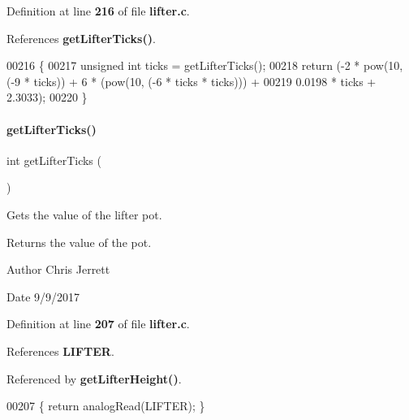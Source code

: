 Definition at line \textbf{ 216} of file \textbf{ lifter.\+c}.



References \textbf{ get\+Lifter\+Ticks()}.


\begin{DoxyCode}
00216                          \{
00217   \textcolor{keywordtype}{unsigned} \textcolor{keywordtype}{int} ticks = getLifterTicks();
00218   \textcolor{keywordflow}{return} (-2 * pow(10, (-9 * ticks)) + 6 * (pow(10, (-6 * ticks * ticks))) +
00219           0.0198 * ticks + 2.3033);
00220 \}
\end{DoxyCode}
\mbox{\label{a00026_acdf909159b0406c48099843f2306be78}} 
\paragraph{get\+Lifter\+Ticks()}
{\footnotesize\ttfamily int get\+Lifter\+Ticks (\begin{DoxyParamCaption}{ }\end{DoxyParamCaption})}



Gets the value of the lifter pot. 

\begin{DoxyReturn}{Returns}
the value of the pot. 
\end{DoxyReturn}
\begin{DoxyAuthor}{Author}
Chris Jerrett 
\end{DoxyAuthor}
\begin{DoxyDate}{Date}
9/9/2017 
\end{DoxyDate}


Definition at line \textbf{ 207} of file \textbf{ lifter.\+c}.



References \textbf{ L\+I\+F\+T\+ER}.



Referenced by \textbf{ get\+Lifter\+Height()}.


\begin{DoxyCode}
00207 \{ \textcolor{keywordflow}{return} analogRead(LIFTER); \}
\end{DoxyCode}
\mbox{\label{a00026_ab0460888f3213e5510bd25ae1e152a75}} 
